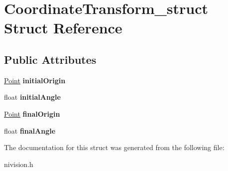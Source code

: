 \hypertarget{structCoordinateTransform__struct}{
\section{CoordinateTransform\_\-struct Struct Reference}
\label{structCoordinateTransform__struct}
}
\subsection*{Public Attributes}
\begin{DoxyCompactItemize}
\item 
\hypertarget{structCoordinateTransform__struct_aef069d3dd5b11fa88c8c068cb5bb975a}{
\hyperlink{structPoint__struct}{Point} {\bfseries initialOrigin}}
\label{structCoordinateTransform__struct_aef069d3dd5b11fa88c8c068cb5bb975a}

\item 
\hypertarget{structCoordinateTransform__struct_a55181d79cf0d1a88a3c553d05288adab}{
float {\bfseries initialAngle}}
\label{structCoordinateTransform__struct_a55181d79cf0d1a88a3c553d05288adab}

\item 
\hypertarget{structCoordinateTransform__struct_a46130a6771554d6652f099c944d0073e}{
\hyperlink{structPoint__struct}{Point} {\bfseries finalOrigin}}
\label{structCoordinateTransform__struct_a46130a6771554d6652f099c944d0073e}

\item 
\hypertarget{structCoordinateTransform__struct_a53dfa395fd10f7ee7fe8e76062603679}{
float {\bfseries finalAngle}}
\label{structCoordinateTransform__struct_a53dfa395fd10f7ee7fe8e76062603679}

\end{DoxyCompactItemize}


The documentation for this struct was generated from the following file:\begin{DoxyCompactItemize}
\item 
nivision.h\end{DoxyCompactItemize}
